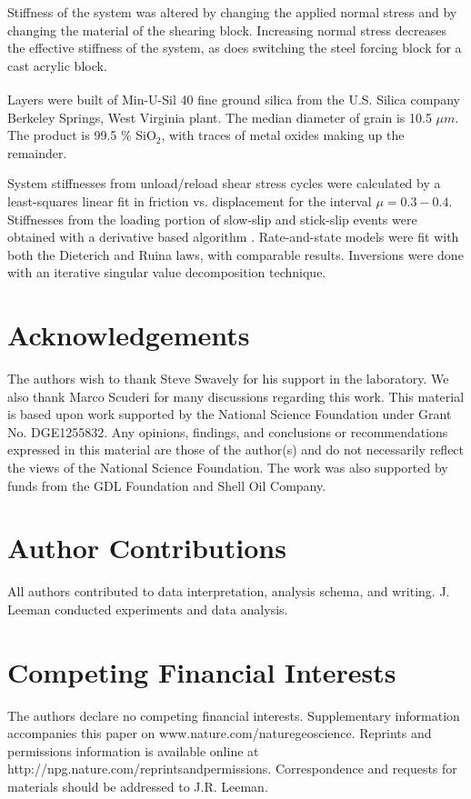 \documentclass[11pt]{article}
\begin{document}
Stiffness of the system was altered by changing the applied normal stress and by
changing the material of the shearing block. Increasing normal stress decreases
the effective stiffness of the system, as does switching the steel forcing block
for a cast acrylic block.

Layers were built of Min-U-Sil\textsuperscript{\textregistered} 40 fine ground
silica from the U.S. Silica\textsuperscript{\textregistered} company Berkeley
Springs, West Virginia plant. The median diameter of grain is 10.5 $\mu m$. The
product is 99.5 \% SiO$_2$, with traces of metal oxides making up the remainder.

System stiffnesses from unload/reload shear stress cycles were calculated by a
least-squares linear fit in friction vs. displacement for the interval $\mu =
0.3-0.4$. Stiffnesses from the loading portion of slow-slip and stick-slip
events were obtained with a derivative based algorithm \cite{Leeman:2015}.
Rate-and-state models were fit with both the Dieterich and
Ruina laws, with comparable results. Inversions were done with an iterative
singular value decomposition technique.



\section{Acknowledgements}
The authors wish to thank Steve Swavely for his support in the laboratory.
We also thank Marco Scuderi for many discussions regarding this work. This
material is based upon work supported by the National Science Foundation under
Grant No. DGE1255832.  Any opinions, findings, and conclusions or
recommendations expressed in this material are those of the author(s) and do not
necessarily reflect the views of the National Science Foundation. The work was
also supported by funds from the GDL Foundation and Shell Oil Company.

\section{Author Contributions}
All authors contributed to data interpretation, analysis schema, and writing.
J. Leeman conducted experiments and data analysis.

\section{Competing Financial Interests}
The authors declare no competing financial interests. Supplementary information
accompanies this paper on www.nature.com/naturegeoscience. Reprints and permissions information is
available online at http://npg.nature.com/reprintsandpermissions. Correspondence
and requests for materials should be addressed to J.R. Leeman.
\end{document}

